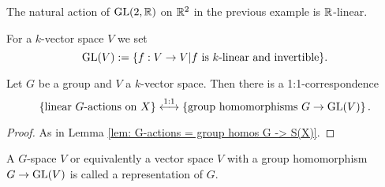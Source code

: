 \begin{expl}
 The natural action of $\operatorname{GL}(2,\mathbb{R})$ on $\mathbb{R}^2$ in the previous example is $\mathbb{R}$-linear.
\end{expl}


For a $k$-vector space $V$ we set
\[
 \operatorname{GL}(V) := \{f : V \to V | f \text{ is $k$-linear and invertible}\}.
\]


\begin{lem}
 Let $G$ be a group and $V$ a $k$-vector space. Then there is a 1:1-correspondence
 \[
    \left\{\text{linear $G$-actions on $X$}\right\}
  \overset{1:1}{\longleftrightarrow}
  \left\{\text{group homomorphisms $G \to \operatorname{GL}(V)$}\right\}.
 \]
\end{lem}
\begin{proof}
 As in Lemma \ref{lem: G-actions = group homos G -> S(X)}.
\end{proof}


\begin{rem}
 A $G$-space $V$ or equivalently a vector space $V$ with a group homomorphism $G \to \operatorname{GL}(V)$ is called a representation of $G$.
\end{rem}


